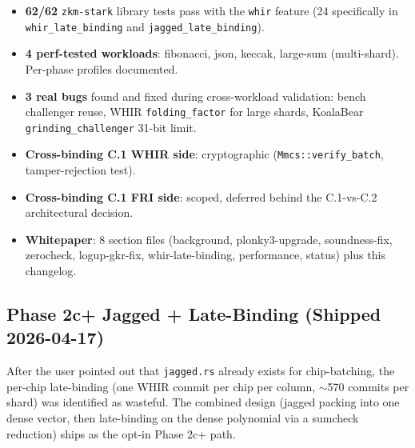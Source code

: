 \begin{itemize}
  \item \textbf{62/62} \texttt{zkm-stark} library tests pass with the
        \texttt{whir} feature (24 specifically in
        \texttt{whir\_late\_binding} and \texttt{jagged\_late\_binding}).
  \item \textbf{4 perf-tested workloads}: fibonacci, json, keccak,
        large-sum (multi-shard).  Per-phase profiles documented.
  \item \textbf{3 real bugs} found and fixed during cross-workload
        validation: bench challenger reuse, WHIR
        \texttt{folding\_factor} for large shards, KoalaBear
        \texttt{grinding\_challenger} 31-bit limit.
  \item \textbf{Cross-binding C.1 WHIR side}: cryptographic
        (\texttt{Mmcs::verify\_batch}, tamper-rejection test).
  \item \textbf{Cross-binding C.1 FRI side}: scoped, deferred behind
        the C.1-vs-C.2 architectural decision.
  \item \textbf{Whitepaper}: 8 section files
        (background, plonky3-upgrade, soundness-fix, zerocheck,
        logup-gkr-fix, whir-late-binding, performance, status) plus
        this changelog.
\end{itemize}

\subsection{Phase 2c+ Jagged + Late-Binding (Shipped 2026-04-17)}

After the user pointed out that \texttt{jagged.rs} already exists for
chip-batching, the per-chip late-binding (one WHIR commit per chip per
column, $\sim$570 commits per shard) was identified as wasteful.  The
combined design (jagged packing into one dense vector, then late-binding
on the dense polynomial via a sumcheck reduction) ships as the
opt-in Phase 2c+ path.

